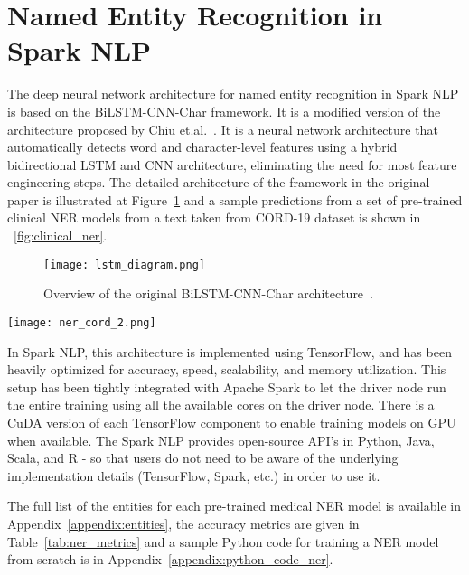 \documentclass[letterpaper]{article} \usepackage{aaai21}  \usepackage{times}  \usepackage{helvet} \usepackage{courier}  \usepackage[hyphens]{url}  \usepackage{graphicx} \urlstyle{rm} \def\UrlFont{\rm}  \usepackage{natbib}  \usepackage{caption} \frenchspacing  \setlength{\pdfpagewidth}{8.5in}  \setlength{\pdfpageheight}{11in}  \usepackage{lscape}
\begin{document}
\section{Named Entity Recognition in Spark NLP}
\label{sec:NerDL}

The deep neural network architecture for named entity recognition in Spark NLP is based on the BiLSTM-CNN-Char framework. It is a modified version of the architecture proposed by Chiu et.al.~\cite{chiu2016named}. It is a neural network architecture that automatically detects word and character-level features using a hybrid bidirectional LSTM and CNN architecture, eliminating the need for most feature engineering steps. The detailed architecture of the framework in the original paper is illustrated at Figure~\ref{fig:ner_dl_diagram} and a sample predictions from a set of pre-trained clinical NER models from a text taken from CORD-19 dataset is shown in ~\ref{fig:clinical_ner}.

\begin{figure}[!htbp]
\texttt{[image: lstm\_diagram.png]}
\centering
\caption{Overview of the original BiLSTM-CNN-Char architecture~\cite{chiu2016named}.}
\label{fig:ner_dl_diagram}
\end{figure}

\begin{figure*}[htb!]
\centering
\texttt{[image: ner\_cord\_2.png]}
\centering
\caption{Sample predictions from pre-trained clinical NER models in Spark NLP for Healthcare}
\label{fig:clinical_ner}
\end{figure*}

In Spark NLP, this architecture is implemented using TensorFlow, and has been heavily optimized for accuracy, speed, scalability, and memory utilization. This setup has been tightly integrated with Apache Spark to let the driver node run the entire training using all the available cores on the driver node. There is a CuDA version of each TensorFlow component to enable training models on GPU when available. The Spark NLP provides open-source API's in Python, Java, Scala, and R - so that users do not need to be aware of the underlying implementation details (TensorFlow, Spark, etc.) in order to use it.

The full list of the entities for each pre-trained medical NER model is available in Appendix~\ref{appendix:entities}, the accuracy metrics are given in Table~\ref{tab:ner_metrics} and a sample Python code for training a NER model from scratch is in Appendix~\ref{appendix:python_code_ner}.
\end{document}
